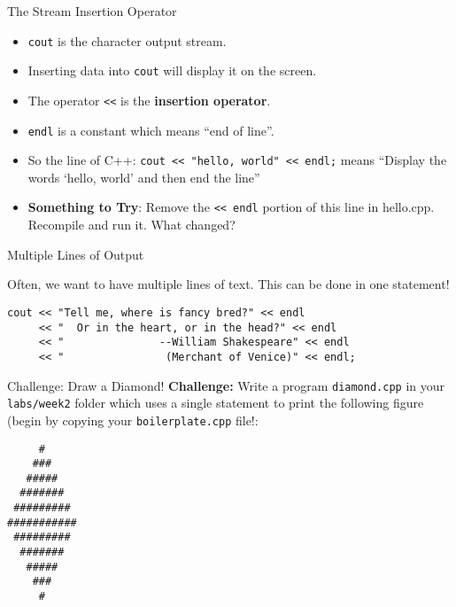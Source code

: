\documentclass{beamer}
\begin{document}
\begin{frame}{The Stream Insertion Operator}
    \begin{itemize}[<+->]
        \item \texttt{cout} is the character output stream.
        \item Inserting data into \texttt{cout} will display it on the
            screen.
        \item The operator \texttt{<<} is the \textbf{insertion operator}.
        \item \texttt{endl} is a constant which means ``end of line''.
        \item So the line of C++:
            \newline\texttt{cout << "hello, world" << endl;} 
            \newline means ``Display the words `hello, world' and then
              end the line''
        \item \textbf{Something to Try}: Remove the \texttt{<< endl} portion of
            this line in hello.cpp.  Recompile and run it.  What changed?
    \end{itemize}
\end{frame}


\begin{frame}[fragile]{Multiple Lines of Output}

    Often, we want to have multiple lines of text. This can be done in
    one statement!
    \newline
    \newline
    \begin{adjustbox}{max width=0.95\textwidth}
    \begin{BVerbatim}
cout << "Tell me, where is fancy bred?" << endl
     << "  Or in the heart, or in the head?" << endl
     << "               --William Shakespeare" << endl
     << "                (Merchant of Venice)" << endl;
    \end{BVerbatim}
    \end{adjustbox}
\end{frame}


\begin{frame}[fragile]{Challenge: Draw a Diamond!}
\textbf{Challenge:} Write a program \texttt{diamond.cpp} in your
\texttt{labs/week2} folder which uses a single statement to print the
following figure (begin by copying your \texttt{boilerplate.cpp} file!:
\begin{verbatim}
     #
    ###
   #####
  #######
 #########
###########
 #########
  #######
   #####
    ###
     #
\end{verbatim}
\end{frame}
\end{document}
